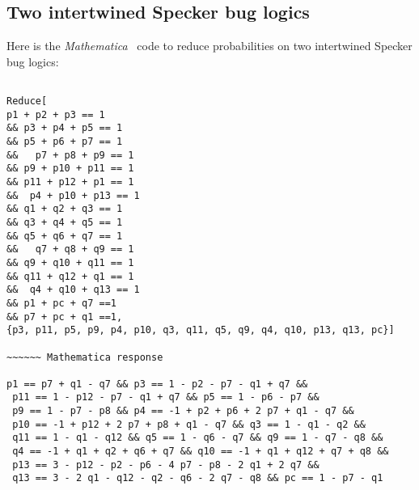 \documentclass[%
 showpacs,
 showkeys,
 preprintnumbers,
 amsmath,amssymb,
 aps,
  pra,
  longbibliography,
 floatfix,
 ]{revtex4-1}
\begin{document}
\subsection{Two intertwined Specker bug logics}
\label{2017-b-bugscombinoa}

Here is the {\em Mathematica}~\cite{Mathematica11.1} code to reduce probabilities on two intertwined Specker bug logics:

{ \begin{lstlisting}[backgroundcolor=\color{yellow!10},framerule=0pt,breaklines=true, frame=tb]

Reduce[
p1 + p2 + p3 == 1
&& p3 + p4 + p5 == 1
&& p5 + p6 + p7 == 1
&&   p7 + p8 + p9 == 1
&& p9 + p10 + p11 == 1
&& p11 + p12 + p1 == 1
&&  p4 + p10 + p13 == 1
&& q1 + q2 + q3 == 1
&& q3 + q4 + q5 == 1
&& q5 + q6 + q7 == 1
&&   q7 + q8 + q9 == 1
&& q9 + q10 + q11 == 1
&& q11 + q12 + q1 == 1
&&  q4 + q10 + q13 == 1
&& p1 + pc + q7 ==1
&& p7 + pc + q1 ==1,
{p3, p11, p5, p9, p4, p10, q3, q11, q5, q9, q4, q10, p13, q13, pc}]

~~~~~~ Mathematica response

p1 == p7 + q1 - q7 && p3 == 1 - p2 - p7 - q1 + q7 &&
 p11 == 1 - p12 - p7 - q1 + q7 && p5 == 1 - p6 - p7 &&
 p9 == 1 - p7 - p8 && p4 == -1 + p2 + p6 + 2 p7 + q1 - q7 &&
 p10 == -1 + p12 + 2 p7 + p8 + q1 - q7 && q3 == 1 - q1 - q2 &&
 q11 == 1 - q1 - q12 && q5 == 1 - q6 - q7 && q9 == 1 - q7 - q8 &&
 q4 == -1 + q1 + q2 + q6 + q7 && q10 == -1 + q1 + q12 + q7 + q8 &&
 p13 == 3 - p12 - p2 - p6 - 4 p7 - p8 - 2 q1 + 2 q7 &&
 q13 == 3 - 2 q1 - q12 - q2 - q6 - 2 q7 - q8 && pc == 1 - p7 - q1

\end{lstlisting}  }
\end{document}
